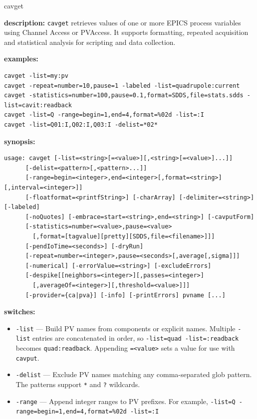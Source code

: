 %
%
\begin{sddsprog}{cavget}
\item \textbf{description:}
\verb+cavget+ retrieves values of one or more EPICS process variables using Channel Access or PVAccess.
It supports formatting, repeated acquisition and statistical analysis for scripting and data collection.
\item \textbf{examples:}
\begin{verbatim}
cavget -list=my:pv
cavget -repeat=number=10,pause=1 -labeled -list=quadrupole:current
cavget -statistics=number=100,pause=0.1,format=SDDS,file=stats.sdds -list=cavit:readback
cavget -list=Q -range=begin=1,end=4,format=%02d -list=:I
cavget -list=Q01:I,Q02:I,Q03:I -delist=*02*
\end{verbatim}
\item \textbf{synopsis:}
\begin{verbatim}
usage: cavget [-list=<string>[=<value>][,<string>[=<value>]...]]
      [-delist=<pattern>[,<pattern>...]]
      [-range=begin=<integer>,end=<integer>[,format=<string>][,interval=<integer>]]
      [-floatformat=<printfString>] [-charArray] [-delimiter=<string>] [-labeled]
      [-noQuotes] [-embrace=start=<string>,end=<string>] [-cavputForm]
      [-statistics=number=<value>,pause=<value>
        [,format=[tagvalue][pretty][SDDS,file=<filename>]]]
      [-pendIoTime=<seconds>] [-dryRun]
      [-repeat=number=<integer>,pause=<seconds>[,average[,sigma]]]
      [-numerical] [-errorValue=<string>] [-excludeErrors]
      [-despike[[neighbors=<integer>][,passes=<integer>]
        [,averageOf=<integer>][,threshold=<value>]]]
      [-provider={ca|pva}] [-info] [-printErrors] pvname [...]
\end{verbatim}
\item \textbf{switches:}
\begin{itemize}
  \item {\tt -list} --- Build PV names from components or explicit names. Multiple
    \verb+-list+ entries are concatenated in order, so \verb+-list=quad -list=:readback+
    becomes \verb+quad:readback+. Appending \verb+=<value>+ sets a value for use with
    \verb+cavput+.
  \item {\tt -delist} --- Exclude PV names matching any comma-separated glob
    pattern. The patterns support \verb+*+ and \verb+?+ wildcards.
  \item {\tt -range} --- Append integer ranges to PV prefixes. \newline
    For example, \verb+-list=Q -range=begin=1,end=4,format=%02d -list=:I+ \newline

\end{itemize}
\end{sddsprog}
